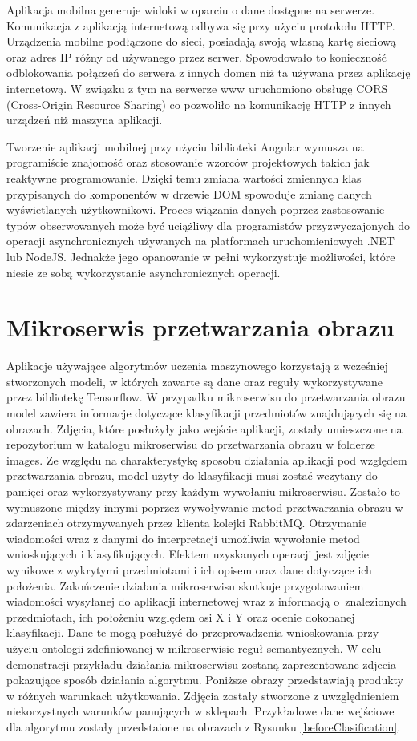 {{Aplikacja mobilna generuje widoki w oparciu o dane dostępne na serwerze. Komunikacja z aplikacją internetową odbywa się przy użyciu protokołu HTTP. Urządzenia mobilne podłączone do sieci, posiadają swoją własną kartę sieciową oraz adres IP różny od używanego przez serwer. Spowodowało to konieczność odblokowania połączeń do serwera z innych domen niż ta używana przez aplikację internetową. W związku z tym na serwerze www uruchomiono obsługę CORS \cite{CORS} (Cross-Origin Resource Sharing) co pozwoliło na komunikację HTTP z innych urządzeń niż maszyna aplikacji. 

Tworzenie aplikacji mobilnej przy użyciu biblioteki Angular wymusza na programiście znajomość oraz stosowanie wzorców projektowych takich jak reaktywne programowanie. Dzięki temu zmiana wartości zmiennych klas przypisanych do komponentów w drzewie DOM spowoduje zmianę danych wyświetlanych użytkownikowi. Proces wiązania danych poprzez zastosowanie typów obserwowanych może być uciążliwy dla programistów przyzwyczajonych do operacji asynchronicznych używanych na platformach uruchomieniowych .NET lub NodeJS. Jednakże jego opanowanie w pełni wykorzystuje możliwości, które niesie ze sobą wykorzystanie asynchronicznych operacji.
}
\section{Mikroserwis przetwarzania obrazu}
{ Aplikacje używające algorytmów uczenia maszynowego korzystają z wcześniej stworzonych modeli, w których zawarte są dane oraz reguły wykorzystywane przez bibliotekę Tensorflow. W przypadku mikroserwisu do przetwarzania obrazu model zawiera informacje dotyczące klasyfikacji przedmiotów znajdujących się na obrazach. Zdjęcia, które posłużyły jako wejście aplikacji, zostały umieszczone na repozytorium w katalogu mikroserwisu do przetwarzania obrazu w folderze images. Ze względu na charakterystykę sposobu działania aplikacji pod względem przetwarzania obrazu, model użyty do klasyfikacji musi zostać wczytany do pamięci oraz wykorzystywany przy każdym wywołaniu mikroserwisu. Zostało to wymuszone między innymi poprzez wywoływanie metod przetwarzania obrazu w zdarzeniach otrzymywanych przez klienta kolejki RabbitMQ. Otrzymanie wiadomości wraz z danymi do interpretacji umożliwia wywołanie metod wnioskujących i klasyfikujących. Efektem uzyskanych operacji jest zdjęcie wynikowe z wykrytymi przedmiotami i ich opisem oraz dane dotyczące ich położenia. Zakończenie działania mikroserwisu skutkuje przygotowaniem wiadomości wysyłanej do aplikacji internetowej wraz z informacją o~znalezionych przedmiotach, ich położeniu względem osi X i Y oraz ocenie dokonanej klasyfikacji. Dane te mogą posłużyć do przeprowadzenia wnioskowania przy użyciu ontologii zdefiniowanej w mikroserwisie reguł semantycznych.
\newpage
W celu demonstracji przykładu działania mikroserwisu zostaną zaprezentowane zdjecia pokazujące sposób działania algorytmu. Poniższe obrazy przedstawiają produkty w różnych warunkach użytkowania. Zdjęcia zostały stworzone z uwzględnieniem niekorzystnych warunków panujących w sklepach. Przykładowe dane wejściowe dla algorytmu zostały przedstaione na obrazach z Rysunku \ref{beforeClasification}.

}}
